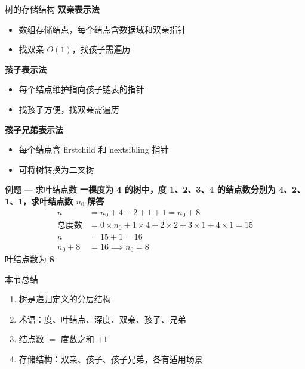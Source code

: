 \documentclass[10pt, aspectratio=169]{beamer}
\begin{document}
\begin{frame}{树的存储结构}
    \textbf{双亲表示法}
    \begin{itemize}
        \item 数组存储结点，每个结点含数据域和双亲指针
        \item 找双亲 $O(1)$，找孩子需遍历
    \end{itemize}
    \vspace{0.3em}
    \textbf{孩子表示法}
    \begin{itemize}
        \item 每个结点维护指向孩子链表的指针
        \item 找孩子方便，找双亲需遍历
    \end{itemize}
    \vspace{0.3em}
    \textbf{孩子兄弟表示法}
    \begin{itemize}
        \item 每个结点含 firstchild 和 nextsibling 指针
        \item 可将树转换为二叉树
    \end{itemize}
\end{frame}

\begin{frame}{例题 --- 求叶结点数}
    \textbf{一棵度为 4 的树中，度 1、2、3、4 的结点数分别为 4、2、1、1，求叶结点数 $n_0$}
    \vspace{0.5em}
    \textbf{解答}
    \[
    \begin{aligned}
    n &= n_0 + 4 + 2 + 1 + 1 = n_0 + 8\\
    \text{总度数} &= 0 \times n_0 + 1 \times 4 + 2 \times 2 + 3 \times 1 + 4 \times 1 = 15\\
    n &= 15 + 1 = 16\\
    n_0 + 8 &= 16 \implies n_0 = 8
    \end{aligned}
    \]
    \vspace{0.3em}
    叶结点数为 \textbf{8}
\end{frame}

\begin{frame}{本节总结}
    \begin{enumerate}
        \item 树是递归定义的分层结构
        \item 术语：度、叶结点、深度、双亲、孩子、兄弟
        \item 结点数 $=$ 度数之和 $+1$
        \item 存储结构：双亲、孩子、孩子兄弟，各有适用场景
    \end{enumerate}
\end{frame}
\end{document}
